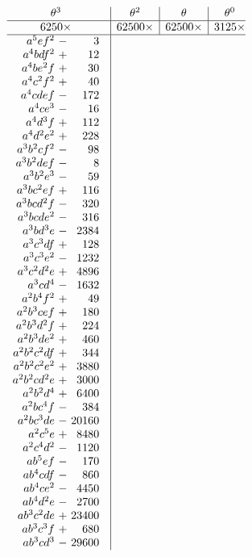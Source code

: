 \begingroup
\tiny
\setlength{\arraycolsep}{1.2pt}
\renewcommand{\arraystretch}{0.67}
\[
\begin{array}{@{}c|c|c|c@{}}
\theta^3 & \theta^2 & \theta & \theta^0\\
\hline
6250\times & 62500\times & 62500\times & 3125\times\\
\hline
\begin{array}{r@{\ }c@{\ }r}
a^5ef^2&-&3\\
a^4bdf^2&+&12\\
a^4be^2f&+&30\\
a^4c^2f^2&+&40\\
a^4cdef&-&172\\
a^4ce^3&-&16\\
a^4d^3f&+&112\\
a^4d^2e^2&+&228\\
a^3b^2cf^2&-&98\\
a^3b^2def&-&8\\
a^3b^2e^3&-&59\\
a^3bc^2ef&+&116\\
a^3bcd^2f&-&320\\
a^3bcde^2&-&316\\
a^3bd^3e&-&2384\\
a^3c^3df&+&128\\
a^3c^3e^2&-&1232\\
a^3c^2d^2e&+&4896\\
a^3cd^4&-&1632\\
a^2b^4f^2&+&49\\
a^2b^3cef&+&180\\
a^2b^3d^2f&+&224\\
a^2b^3de^2&+&460\\
a^2b^2c^2df&+&344\\
a^2b^2c^2e^2&+&3880\\
a^2b^2cd^2e&+&3000\\
a^2b^2d^4&+&6400\\
a^2bc^4f&-&384\\
a^2bc^3de&-&20160\\
a^2c^5e&+&8480\\
a^2c^4d^2&-&1120\\
ab^5ef&-&170\\
ab^4cdf&-&860\\
ab^4ce^2&-&4450\\
ab^4d^2e&-&2700\\
ab^3c^2de&+&23400\\
ab^3c^3f&+&680\\
ab^3cd^3&-&29600\\

\end{array}
\end{array}\]

